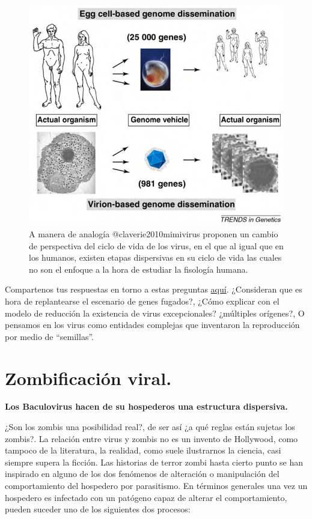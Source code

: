 \documentclass[
  12pt, krantz2,
  spanish,
]{krantz}
\begin{document}
\begin{figure}
\includegraphics[width=0.8\linewidth]{figures/analogy} \caption{A manera de analogía @claverie2010mimivirus proponen un cambio de perspectiva del ciclo de vida de los virus, en el que al igual que en los humanos, existen etapas dispersivas en su ciclo de vida las cuales no son el enfoque a la hora de estudiar la fisología humana.}\label{fig:analogy}
\end{figure}

Compartenos tus respuestas en torno a estas preguntas \href{https://www.facebook.com/permalink.php?story_fbid=145223737202449\&id=107088044349352}{aquí}. ¿Consideran que es hora de replantearse el escenario de genes fugados?, ¿Cómo explicar con el modelo de reducción la existencia de virus excepcionales? ¿múltiples orígenes?, O pensamos en los virus como entidades complejas que inventaron la reproducción por medio de ``semillas''.

\hypertarget{zombi}{%
\section{Zombificación viral.}\label{zombi}}

\textbf{Los Baculovirus hacen de su hospederos una estructura dispersiva.}

¿Son los zombis una posibilidad real?, de ser así ¿a qué reglas están sujetas los zombis?. La relación entre virus y zombis no es un invento de Hollywood, como tampoco de la literatura, la realidad, como suele ilustrarnos la ciencia, casi siempre supera la ficción. Las historias de terror zombi hasta cierto punto se han inspirado en alguno de los dos fenómenos de alteración o manipulación del comportamiento del hospedero por parasitismo. En términos generales una vez un hospedero es infectado con un patógeno capaz de alterar el comportamiento, pueden suceder uno de los siguientes dos procesos:
\end{document}
